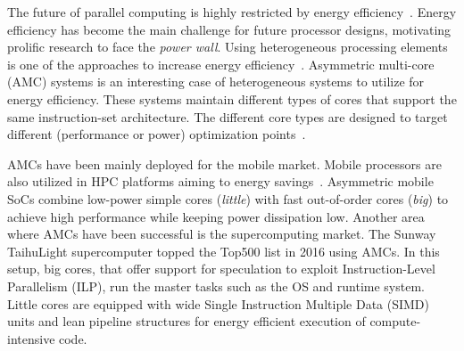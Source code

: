 
The future of parallel computing is highly restricted by energy efficiency~\cite{Kogge_Exascale_TR08}. 
Energy efficiency has become the main challenge for future processor designs, motivating prolific research to face the \emph{power wall}. 
Using heterogeneous processing elements is one of the approaches to increase energy efficiency~\cite{CompCores,hetServers}. 
Asymmetric multi-core (AMC) systems is an interesting case of heterogeneous systems to utilize for energy efficiency.
These systems maintain different types of cores that support the same instruction-set architecture. 
The different core types are designed to target different (performance or power) optimization points~\cite{Kumar:ISCA2004,Balakrishnan:ISCA2005,Pangaea}. 

AMCs have been mainly deployed for the mobile market. 
Mobile processors are also utilized in HPC platforms aiming to energy savings~\cite{ARMV8}.
Asymmetric mobile SoCs combine low-power simple cores (\emph{little}) with fast out-of-order cores (\emph{big}) to achieve high performance while keeping power dissipation low.
Another area where AMCs have been successful is the supercomputing market.
The Sunway TaihuLight supercomputer topped the Top500 list in 2016 using AMCs. 
In this setup, big cores, that offer support for speculation to exploit Instruction-Level Parallelism (ILP), run the master tasks such as the OS and runtime system.
Little cores are equipped with wide Single Instruction Multiple Data (SIMD) units and lean pipeline structures for energy efficient execution of compute-intensive code. 

